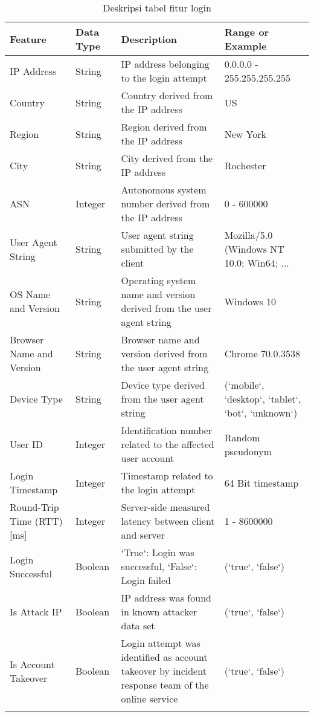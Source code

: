 \begin{longtable}{|p{}|p{}|p{}|p{}|}
    \hline
    \textbf{Feature} & \textbf{Data Type} & \textbf{Description} & \textbf{Range or Example} \\ \hline
    IP Address & String & IP address belonging to the login attempt & 0.0.0.0 - 255.255.255.255 \\ \hline
    Country & String & Country derived from the IP address & US \\ \hline
    Region & String & Region derived from the IP address & New York \\ \hline
    City & String & City derived from the IP address & Rochester \\ \hline
    ASN & Integer & Autonomous system number derived from the IP address & 0 - 600000 \\ \hline
    User Agent String & String & User agent string submitted by the client & Mozilla/5.0 (Windows NT 10.0; Win64; ... \\ \hline
    OS Name and Version & String & Operating system name and version derived from the user agent string & Windows 10 \\ \hline
    Browser Name and Version & String & Browser name and version derived from the user agent string & Chrome 70.0.3538 \\ \hline
    Device Type & String & Device type derived from the user agent string & (`mobile`, `desktop`, `tablet`, `bot`, `unknown`) \\ \hline
    User ID & Integer & Identification number related to the affected user account & Random pseudonym \\ \hline
    Login Timestamp & Integer & Timestamp related to the login attempt & 64 Bit timestamp \\ \hline
    Round-Trip Time (RTT) [ms] & Integer & Server-side measured latency between client and server & 1 - 8600000 \\ \hline
    Login Successful & Boolean & `True`: Login was successful, `False`: Login failed & (`true`, `false`) \\ \hline
    Is Attack IP & Boolean & IP address was found in known attacker data set & (`true`, `false`) \\ \hline
    Is Account Takeover & Boolean & Login attempt was identified as account takeover by incident response team of the online service & (`true`, `false`) \\ \hline
    \caption{Deskripsi tabel fitur login}
    \label{tab:my_label}
\end{longtable}

